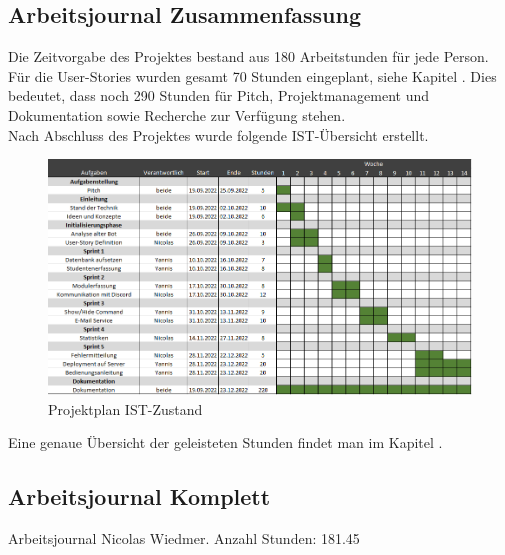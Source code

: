 \documentclass[a4paper, table]{article}
\begin{document}
\newpage
\subsection{Arbeitsjournal Zusammenfassung}
Die Zeitvorgabe des Projektes bestand aus 180 Arbeitstunden für jede Person.
Für die User-Stories wurden gesamt 70 Stunden eingeplant, siehe Kapitel .
Dies bedeutet, dass noch 290 Stunden für Pitch, Projektmanagement und Dokumentation sowie Recherche zur Verfügung stehen.\\
Nach Abschluss des Projektes wurde folgende IST-Übersicht erstellt.

\begin{figure}[h]
    \centering
    \includegraphics[width=1\textwidth]{img/Projektplan-IST.png}
    \caption{Projektplan IST-Zustand}
    \label{fig:plan-hours-actual-state}
\end{figure}

Eine genaue Übersicht der geleisteten Stunden findet man im Kapitel .

\newpage
\subsection{Arbeitsjournal Komplett}\label{work-journal-complete}
Arbeitsjournal Nicolas Wiedmer.
Anzahl Stunden: 181.45
\end{document}
